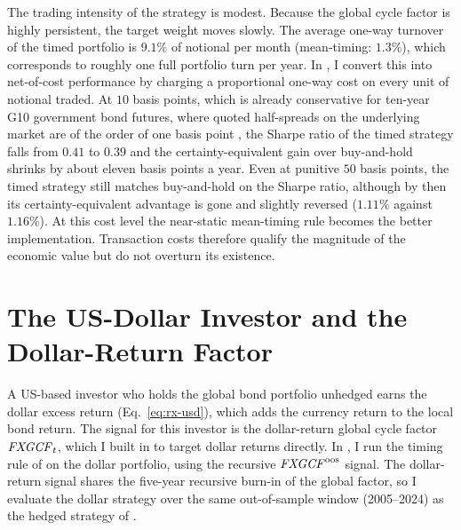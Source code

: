 The trading intensity of the strategy is modest. Because the global cycle
factor is highly persistent, the target weight moves slowly. The average
one-way turnover of the timed portfolio is $9.1\%$ of notional per month
(mean-timing: $1.3\%$), which corresponds to roughly one full portfolio turn
per year. In , I convert this into net-of-cost
performance by charging a proportional one-way cost on every unit of notional
traded. At $10$ basis points, which is already conservative for ten-year G10
government bond futures, where quoted half-spreads on the underlying market are
of the order of one basis point \citep{fleming2003}, the Sharpe ratio of the
timed strategy falls from $0.41$ to
$0.39$ and the certainty-equivalent gain over buy-and-hold shrinks by about
eleven basis points a year. Even at punitive $50$ basis points,
the timed strategy still matches buy-and-hold on the Sharpe ratio, although by
then its certainty-equivalent advantage is gone and slightly reversed
($1.11\%$ against $1.16\%$). At this cost level the near-static mean-timing rule becomes the
better implementation. Transaction costs therefore qualify the magnitude of
the economic value but do not overturn its existence.

\begin{table}[t]
  \caption{Turnover and net-of-cost performance}
  \label{tab:strat-costs}
  \centering
  
\end{table}

\section{The US-Dollar Investor and the Dollar-Return Factor}
\label{sec:strat-fx}

A US-based investor who holds the global bond portfolio unhedged earns the
dollar excess return (Eq.~\ref{eq:rx-usd}), which adds the currency return to the
local bond return. The signal for this investor is the dollar-return
global cycle factor $\mathit{FXGCF}_{t}$, which I built in  to
target dollar returns directly. In , I run the timing
rule of  on the dollar portfolio, using the recursive
$\mathit{FXGCF}^{\mathrm{oos}}$ signal. The
dollar-return signal shares the five-year recursive burn-in of the global
factor, so I evaluate the dollar strategy over the same out-of-sample window
(2005--2024) as the hedged strategy of .

